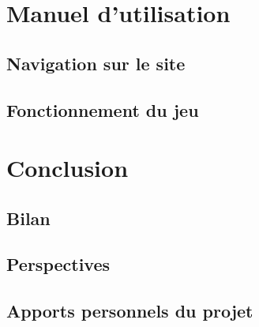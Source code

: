 \documentclass[12pt]{report}
\begin{document}
\chapter{Manuel d'utilisation}

    \section{Navigation sur le site}
    
    \section{Fonctionnement du jeu}
    
\chapter*{Conclusion}

    \section*{Bilan}
    
    \section*{Perspectives}

    \section*{Apports personnels du projet}
\end{document}
